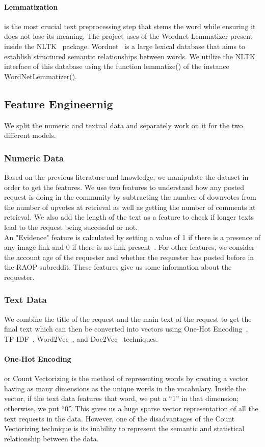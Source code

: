 \documentclass[runningheads]{llncs}
\begin{document}
\paragraph{Lemmatization} is the most crucial text preprocessing step that stems the word while ensuring it does not lose its meaning. The project uses of the Wordnet Lemmatizer present inside the NLTK~\cite{nltk} package. Wordnet~\cite{wordnet} is a large lexical database that aims to establish structured semantic relationships between words. We utilize the NLTK~\cite{nltk} interface of this database using the function lemmatize() of the instance WordNetLemmatizer().

\subsection{Feature Engineernig}
We split the numeric and textual data and separately work on it for the two different models.
\subsubsection{Numeric Data}
Based on the previous literature and knowledge, we manipulate the dataset in order to get the features. We use two features to understand how any posted request is doing in the community by subtracting the number of downvotes from the number of upvotes at retrieval as well as getting the number of comments at retrieval. We also add the length of the text as a feature to check if longer texts lead to the request being successful or not.\\
An "Evidence" feature is calculated by setting a value of 1 if there is a presence of any image link and 0 if there is no link present~\cite{raop_base}. For other features, we consider the account age of the requester and whether the requester has posted before in the RAOP subreddit. These features give us some information about the requester.
\subsubsection{Text Data}
We combine the title of the request and the main text of the request to get the final text which can then be converted into vectors using One-Hot Encoding~\cite{one_hot}, TF-IDF~\cite{tfidf}, Word2Vec~\cite{w2v}, and Doc2Vec~\cite{d2v} techniques.
\paragraph{One-Hot Encoding} or Count Vectorizing is the method of representing words by creating a vector having as many dimensions as the unique words in the vocabulary. Inside the vector, if the text data features that word, we put a “1” in that dimension; otherwise, we put “0”. This gives us a huge sparse vector representation of all the text requests in the data. However, one of the disadvantages of the Count Vectorizing technique is its inability to represent the semantic and statistical relationship between the data.
\end{document}
